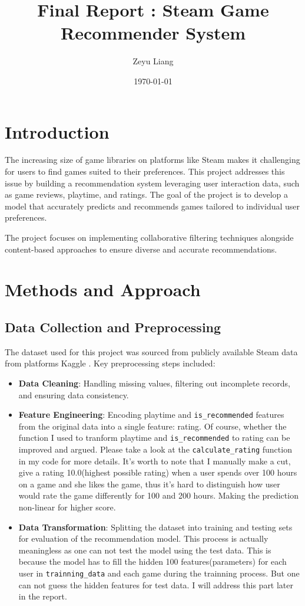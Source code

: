 \documentclass[12pt]{article}
\title{\textbf{Final Report : Steam Game Recommender System}}
\author{Zeyu Liang}
\date{\today}
\begin{document}
\maketitle
\section{Introduction}
The increasing size of game libraries on platforms like Steam makes it challenging for users to find games suited to their preferences. This project addresses this issue by building a recommendation system leveraging user interaction data, such as game reviews, playtime, and ratings. The goal of the project is to develop a model that accurately predicts and recommends games tailored to individual user preferences.

The project focuses on implementing collaborative filtering techniques alongside content-based approaches to ensure diverse and accurate recommendations.
\section{Methods and Approach}
\subsection{Data Collection and Preprocessing}
The dataset used for this project was sourced from publicly available Steam data from platforms Kaggle . Key preprocessing steps included:
\begin{itemize}
	\item \textbf{Data Cleaning}: Handling missing values, filtering out incomplete records, and ensuring data consistency.
	\item \textbf{Feature Engineering}: Encoding playtime and \texttt{is\_recommended} features from the original data into a single feature: rating.  Of course, whether the function I used to tranform playtime and \texttt{is\_recommended} to rating can be improved and argued. Please take a look at the \texttt{calculate\_rating} function in my code for more details. It's worth to note that I manually make a cut, give a rating 10.0(highest possible rating) when a user spends over 100 hours on a game and she likes the game, thus it's hard to distinguish how user would rate the game differently for 100 and 200 hours. Making the prediction non-linear for higher score. 
	\item \textbf{Data Transformation}: Splitting the dataset into training and testing sets for evaluation of the recommendation model. This process is actually meaningless as one can not test the model using the test data. This is because the model has to fill the hidden 100 features(parameters) for each user in \texttt{trainning\_data} and each game during the trainning process. But one can not guess the hidden features for test data. I will address this part later in the report.
\end{itemize}
\end{document}
